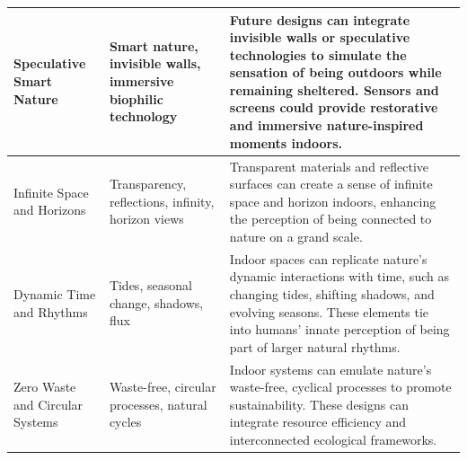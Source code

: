 \begin{longtable}{|p{3cm}|p{3.5cm}|p{7.5cm}|}
Speculative Smart Nature & Smart nature, invisible walls, immersive biophilic technology & Future designs can integrate invisible walls or speculative technologies to simulate the sensation of being outdoors while remaining sheltered. Sensors and screens could provide restorative and immersive nature-inspired moments indoors. \\ \hline

Infinite Space and Horizons & Transparency, reflections, infinity, horizon views & Transparent materials and reflective surfaces can create a sense of infinite space and horizon indoors, enhancing the perception of being connected to nature on a grand scale. \\ \hline

Dynamic Time and Rhythms & Tides, seasonal change, shadows, flux & Indoor spaces can replicate nature’s dynamic interactions with time, such as changing tides, shifting shadows, and evolving seasons. These elements tie into humans' innate perception of being part of larger natural rhythms. \\ \hline

Zero Waste and Circular Systems & Waste-free, circular processes, natural cycles & Indoor systems can emulate nature’s waste-free, cyclical processes to promote sustainability. These designs can integrate resource efficiency and interconnected ecological frameworks. \\ \hline
\end{longtable}